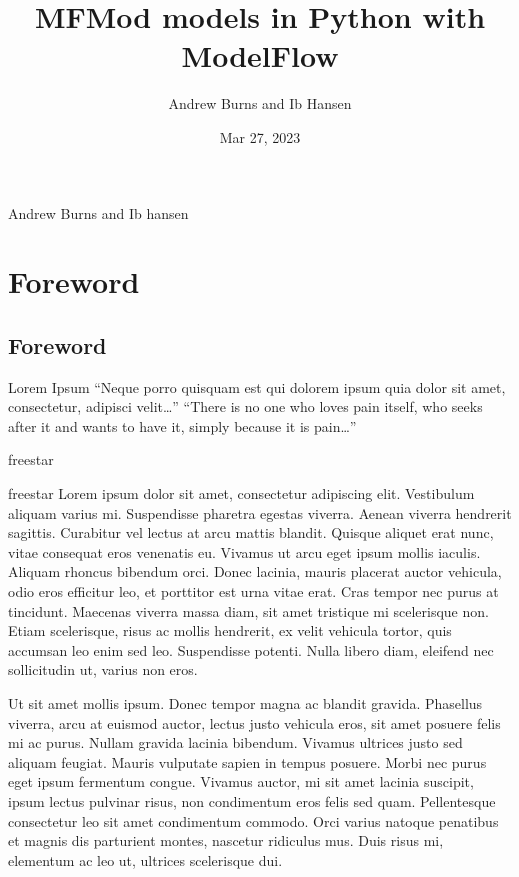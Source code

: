 \documentclass[letterpaper,10pt,english]{jupyterBook}
\title{MFMod models in Python with ModelFlow}
\date{Mar 27, 2023}
\author{Andrew Burns and Ib Hansen}
\begin{document}
\pagestyle{empty}
\sphinxmaketitle
\pagestyle{plain}
\sphinxtableofcontents
\pagestyle{normal}
\label{\detokenize{content/introduction::doc}}




\sphinxAtStartPar
Andrew Burns and Ib hansen



\begin{sphinxVerbatim}[commandchars=\\\{\}]

\end{sphinxVerbatim}

\sphinxstepscope


\part{Foreword}

\sphinxstepscope


\chapter{Foreword}
\label{\detokenize{content/00_Foreword/Foreword:foreword}}\label{\detokenize{content/00_Foreword/Foreword::doc}}
\sphinxAtStartPar
Lorem Ipsum
“Neque porro quisquam est qui dolorem ipsum quia dolor sit amet, consectetur, adipisci velit…”
“There is no one who loves pain itself, who seeks after it and wants to have it, simply because it is pain…”

\sphinxAtStartPar
freestar

\sphinxAtStartPar
freestar
Lorem ipsum dolor sit amet, consectetur adipiscing elit. Vestibulum aliquam varius mi. Suspendisse pharetra egestas viverra. Aenean viverra hendrerit sagittis. Curabitur vel lectus at arcu mattis blandit. Quisque aliquet erat nunc, vitae consequat eros venenatis eu. Vivamus ut arcu eget ipsum mollis iaculis. Aliquam rhoncus bibendum orci. Donec lacinia, mauris placerat auctor vehicula, odio eros efficitur leo, et porttitor est urna vitae erat. Cras tempor nec purus at tincidunt. Maecenas viverra massa diam, sit amet tristique mi scelerisque non. Etiam scelerisque, risus ac mollis hendrerit, ex velit vehicula tortor, quis accumsan leo enim sed leo. Suspendisse potenti. Nulla libero diam, eleifend nec sollicitudin ut, varius non eros.

\sphinxAtStartPar
Ut sit amet mollis ipsum. Donec tempor magna ac blandit gravida. Phasellus viverra, arcu at euismod auctor, lectus justo vehicula eros, sit amet posuere felis mi ac purus. Nullam gravida lacinia bibendum. Vivamus ultrices justo sed aliquam feugiat. Mauris vulputate sapien in tempus posuere. Morbi nec purus eget ipsum fermentum congue. Vivamus auctor, mi sit amet lacinia suscipit, ipsum lectus pulvinar risus, non condimentum eros felis sed quam. Pellentesque consectetur leo sit amet condimentum commodo. Orci varius natoque penatibus et magnis dis parturient montes, nascetur ridiculus mus. Duis risus mi, elementum ac leo ut, ultrices scelerisque dui.
\end{document}
